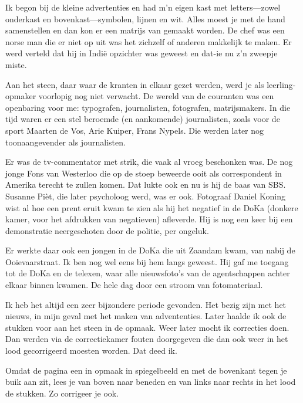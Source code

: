 \documentclass[12pt,twoside, openright]{memoir}
\begin{document}
Ik begon bij de kleine advertenties en had m'n eigen kast met letters---zowel onderkast en bovenkast---symbolen, lijnen en wit. Alles moest je met de hand samenstellen en dan kon er een matrijs van gemaakt worden. De chef was een norse man die er niet op uit was het zichzelf of anderen makkelijk te maken. Er werd verteld dat hij in Indië opzichter was geweest en dat-ie nu z'n zweepje miste.

Aan het steen, daar waar de kranten in elkaar gezet werden, werd je als leerling-opmaker voorlopig nog niet verwacht. De wereld van de couranten was een openbaring voor me: typografen, journalisten, fotografen, matrijsmakers. In die tijd waren er een stel beroemde (en aankomende) journalisten, zoals voor de sport Maarten de Vos, Arie Kuiper, Frans Nypels. Die werden later nog toonaangevender als journalisten. 

Er was de tv-commentator met strik, die vaak al vroeg beschonken was. De nog jonge Fons van Westerloo die op de stoep beweerde ooit als correspondent in Amerika terecht te zullen komen. Dat lukte ook en nu is hij de baas van SBS. Susanne Pièt, die later psycholoog werd, was er ook. Fotograaf Daniel Koning wist al hoe een prent eruit kwam te zien als hij het negatief in de DoKa (donkere kamer, voor het afdrukken van negatieven) afleverde. Hij is nog een keer bij een demonstratie neergeschoten door de politie, per ongeluk. 

Er werkte daar ook een jongen in de DoKa die uit Zaandam kwam,  van nabij de Ooievaarstraat. Ik ben nog wel eens bij hem langs geweest. Hij gaf me toegang tot de DoKa en de telexen, waar alle nieuwsfoto’s van de agentschappen achter elkaar binnen kwamen. De hele dag door een stroom van fotomateriaal. 

Ik heb het altijd een zeer bijzondere periode gevonden. Het bezig zijn met het nieuws, in mijn geval met het maken van advententies. Later haalde ik ook de stukken voor aan het steen in de opmaak. Weer later mocht ik correcties doen. Dan werden via de correctiekamer fouten doorgegeven die dan ook weer in het lood gecorrigeerd moesten worden. Dat deed ik. 

Omdat de pagina een in opmaak in spiegelbeeld en met de bovenkant tegen je buik aan zit, lees je van boven naar beneden en van links naar rechts in het lood de stukken. Zo corrigeer je ook. 
\end{document}
